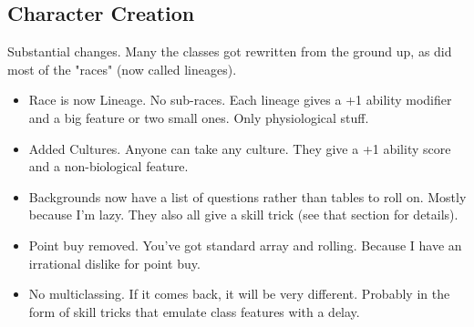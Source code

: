 \subsection*{Character Creation}
Substantial changes. Many the classes got rewritten from the ground up, as did most of the "races" (now called lineages). 
\begin{itemize}
    \item Race is now Lineage. No sub-races. Each lineage gives a +1 ability modifier and a big feature or two small ones. Only physiological stuff.
    \item Added Cultures. Anyone can take any culture. They give a +1 ability score and a non-biological feature.
    \item Backgrounds now have a list of questions rather than tables to roll on. Mostly because I'm lazy. They also all give a skill trick (see that section for details).
    \item Point buy removed. You've got standard array and rolling. Because I have an irrational dislike for point buy.
    \item No multiclassing. If it comes back, it will be very different. Probably in the form of skill tricks that emulate class features with a delay.
\end{itemize}
